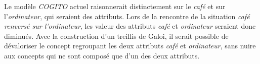 Le modèle \emph{COGITO} actuel raisonnerait distinctement sur le \emph{café} et sur l'\emph{ordinateur}, qui seraient des attributs. Lors de la rencontre de la situation \emph{café renversé sur l'ordinateur}, les valeur des attributs \emph{café} et \emph{ordinateur} seraient donc diminués. Avec la construction d'un treillis de Galoi, il serait possible de dévaloriser le concept regroupant les deux attributs \emph{café} et \emph{ordinateur}, sans nuire aux concepts qui ne sont composé que d'un des deux attributs.